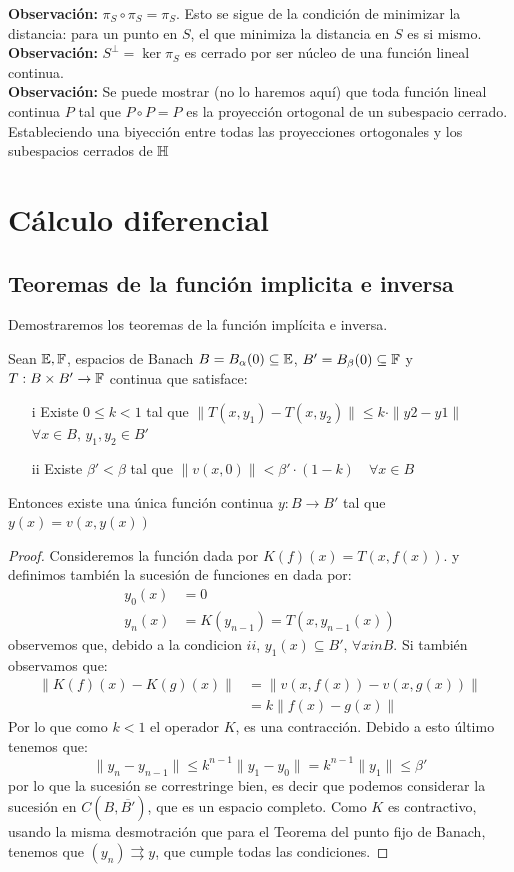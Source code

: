 \documentclass[12pt,a4paper]{book}
\begin{document}
\textbf{Observación:} $\pi_S \circ \pi_S = \pi_S$. Esto se sigue de la condición de minimizar la distancia: para un punto en $S$, el que minimiza la distancia en $S$ es si mismo.\\[0.5cm]
\textbf{Observación:} $S^{\perp} = \ker \pi_S$ es cerrado por ser núcleo de una función lineal continua.\\[0.5cm]
\textbf{Observación:} Se puede mostrar (no lo haremos aquí) que toda función lineal continua $P$ tal que $ P \circ P = P$ es la proyección ortogonal de un subespacio cerrado. Estableciendo una biyección entre todas las proyecciones ortogonales y los subespacios cerrados de $\mathbb{H}$
\chapter{Cálculo diferencial}
\section{Teoremas de la función implicita e inversa}
Demostraremos los teoremas de la función implícita e inversa.
\begin{lem}
Sean $\mathbb{E},\mathbb{F}$, espacios de Banach $B = B_{\alpha}(0) \subseteq \mathbb{E}$,  $B' = B_{\beta}(0) \subseteq \mathbb{F}$ y $T: B \times B' \rightarrow \mathbb{F}$ continua que satisface:
\begin{enumerate}
\item[i] Existe $0 \leq k < 1$ tal que $\| T(x,y_1) - T(x,y_2)\| \leq k \cdot \|y2-y1\|$\\$ \forall x \in B,\, y_1,y_2 \in B'$
\item[ii] Existe $\beta' < \beta$ tal que $ \|v(x,0)\| < \beta' \cdot (1-k) \quad \forall x \in B$
\end{enumerate}
Entonces existe una única función continua $y: B \rightarrow B'$ tal que $y(x) = v(x,y(x))$
\end{lem}
\begin{proof}
Consideremos la función dada por $K(f)(x) = T(x,f(x))$. y definimos también la sucesión de funciones en dada por:
\begin{align*}
y_0(x) &= 0 \\
y_n(x) &= K(y_{n-1}) = T(x,y_{n-1}(x))
\end{align*}
observemos que, debido a la condicion $ii$, $y_1(x) \subseteq B'$, $\forall xin B$. Si también observamos que:
\begin{align*}
\| K(f)(x) - K(g)(x)\| &= \| v(x,f(x)) - v(x,g(x)) \| \\
&= k \| f(x) - g(x) \|
\end{align*}
Por lo que como $k<1$ el operador $K$, es una contracción. Debido a esto último tenemos que:
$$ \|y_n -y_{n-1}\| \leq k^{n-1} \|y_1-y_0\| = k^{n-1} \|y_1\| \leq \beta'$$
por lo que la sucesión se correstringe bien, es decir que podemos considerar la sucesión en $C(B,\overline{B'})$, que es un espacio completo. Como $K$ es contractivo, usando la misma desmotración que para el Teorema del punto fijo de Banach, tenemos que $(y_n) \rightrightarrows y$, que cumple todas las condiciones.
\end{proof}
\end{document}

